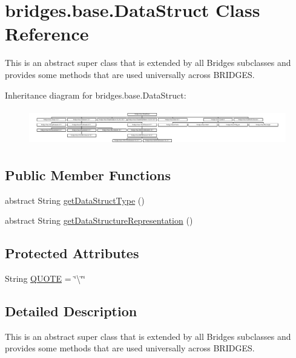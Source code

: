 \hypertarget{classbridges_1_1base_1_1_data_struct}{}\section{bridges.\+base.\+Data\+Struct Class Reference}
\label{classbridges_1_1base_1_1_data_struct}


This is an abstract super class that is extended by all Bridges subclasses and provides some methods that are used universally across B\+R\+I\+D\+G\+ES.  


Inheritance diagram for bridges.\+base.\+Data\+Struct\+:\begin{figure}[H]
\begin{center}
\leavevmode
\includegraphics[height=1.578947cm]{classbridges_1_1base_1_1_data_struct}
\end{center}
\end{figure}
\subsection*{Public Member Functions}
\begin{DoxyCompactItemize}
\item 
abstract String \mbox{\hyperlink{classbridges_1_1base_1_1_data_struct_a3bae9d0d68a85e517a34be482e90fdd4}{get\+Data\+Struct\+Type}} ()
\item 
abstract String \mbox{\hyperlink{classbridges_1_1base_1_1_data_struct_a21991621db575fd832f7a08233cefdc2}{get\+Data\+Structure\+Representation}} ()
\end{DoxyCompactItemize}
\subsection*{Protected Attributes}
\begin{DoxyCompactItemize}
\item 
String \mbox{\hyperlink{classbridges_1_1base_1_1_data_struct_aac4a6ea28f44676274120ba1dddafc1f}{Q\+U\+O\+TE}} = \char`\"{}\textbackslash{}\char`\"{}\char`\"{}
\end{DoxyCompactItemize}


\subsection{Detailed Description}
This is an abstract super class that is extended by all Bridges subclasses and provides some methods that are used universally across B\+R\+I\+D\+G\+ES. 



